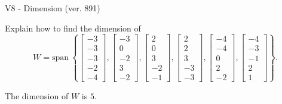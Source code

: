 \begin{exercise}
  \begin{exerciseTitle}V8 - Dimension (ver. 891)\end{exerciseTitle}
  \begin{exerciseStatement}
    Explain how to find the dimension of 
\[W=\mathrm{span}\ \left\{\left[\begin{array}{r}
-3 \\
-3 \\
-3 \\
-2 \\
-4
\end{array}\right] , \left[\begin{array}{r}
-3 \\
0 \\
-2 \\
3 \\
-2
\end{array}\right] , \left[\begin{array}{r}
2 \\
0 \\
3 \\
-2 \\
-1
\end{array}\right] , \left[\begin{array}{r}
2 \\
2 \\
3 \\
-3 \\
-3
\end{array}\right] , \left[\begin{array}{r}
-4 \\
-4 \\
0 \\
2 \\
-2
\end{array}\right] , \left[\begin{array}{r}
-4 \\
-3 \\
-1 \\
2 \\
1
\end{array}\right]\right\}.\]



  \end{exerciseStatement}
  \begin{exerciseAnswer}
   The dimension of \(W\) is  \(5\).
  


  \end{exerciseAnswer}
\end{exercise}